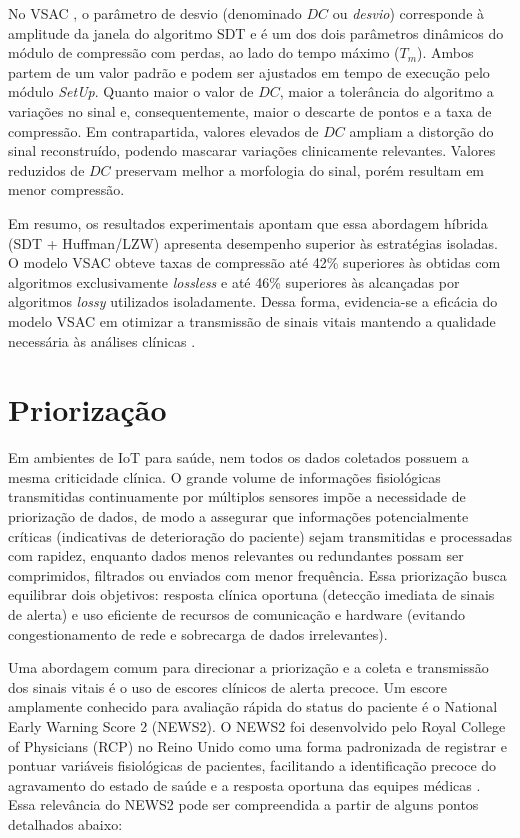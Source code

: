 \documentclass[twoside,english,brazilian]{UNISINOSmonografia}
\begin{document}
No VSAC \cite{Andrade2025}, o parâmetro de desvio (denominado $DC$ ou \textit{desvio}) corresponde à amplitude da janela do algoritmo SDT e é um dos dois parâmetros dinâmicos do módulo de compressão com perdas, ao lado do tempo máximo ($T_m$). Ambos partem de um valor padrão e podem ser ajustados em tempo de execução pelo módulo \textit{SetUp}. Quanto maior o valor de $DC$, maior a tolerância do algoritmo a variações no sinal e, consequentemente, maior o descarte de pontos e a taxa de compressão. Em contrapartida, valores elevados de $DC$ ampliam a distorção do sinal reconstruído, podendo mascarar variações clinicamente relevantes. Valores reduzidos de $DC$ preservam melhor a morfologia do sinal, porém resultam em menor compressão.

Em resumo, os resultados experimentais apontam que essa abordagem híbrida (SDT + Huffman/LZW) apresenta desempenho superior às estratégias isoladas. O modelo VSAC obteve taxas de compressão até 42\% superiores às obtidas com algoritmos exclusivamente \emph{lossless} e até 46\% superiores às alcançadas por algoritmos \emph{lossy} utilizados isoladamente. Dessa forma, evidencia-se a eficácia do modelo VSAC em otimizar a transmissão de sinais vitais mantendo a qualidade necessária às análises clínicas \cite{Andrade2025}.

\section{Priorização}
\label{sec:priorizacao}

Em ambientes de IoT para saúde, nem todos os dados coletados possuem a mesma criticidade clínica. O grande volume de informações fisiológicas transmitidas continuamente por múltiplos sensores impõe a necessidade de priorização de dados, de modo a assegurar que informações potencialmente críticas (indicativas de deterioração do paciente) sejam transmitidas e processadas com rapidez, enquanto dados menos relevantes ou redundantes possam ser comprimidos, filtrados ou enviados com menor frequência. Essa priorização busca equilibrar dois objetivos: resposta clínica oportuna (detecção imediata de sinais de alerta) e uso eficiente de recursos de comunicação e hardware (evitando congestionamento de rede e sobrecarga de dados irrelevantes).

Uma abordagem comum para direcionar a priorização e a coleta e transmissão dos sinais vitais é o uso de escores clínicos de alerta precoce. Um escore amplamente conhecido para avaliação rápida do status do paciente é o National Early Warning Score 2 (NEWS2). O NEWS2 foi desenvolvido pelo Royal College of Physicians (RCP) no Reino Unido como uma forma padronizada de registrar e pontuar variáveis fisiológicas de pacientes, facilitando a identificação precoce do agravamento do estado de saúde e a resposta oportuna das equipes médicas \cite{NHSEngland2025}. Essa relevância do NEWS2 pode ser compreendida a partir de alguns pontos detalhados abaixo:
\end{document}
